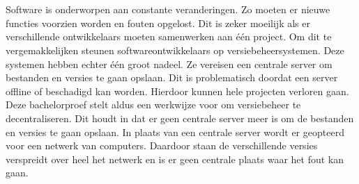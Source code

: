 


%



\chapter*{}
%
%
Software is onderworpen aan constante veranderingen. Zo moeten er nieuwe functies voorzien worden en fouten opgelost. Dit is zeker moeilijk als er verschillende ontwikkelaars moeten samenwerken aan één project. Om dit te vergemakkelijken steunen softwareontwikkelaars op versiebeheersystemen. Deze systemen hebben echter één groot nadeel. Ze vereisen een centrale server om bestanden en versies te gaan opslaan.  Dit is problematisch doordat een server offline of beschadigd kan worden. Hierdoor kunnen hele projecten verloren gaan. Deze bachelorproef stelt aldus een werkwijze voor om versiebeheer te decentraliseren. Dit houdt in dat er geen centrale server meer is om de bestanden en versies te gaan opslaan. In plaats van een centrale server wordt er geopteerd voor een netwerk van computers. Daardoor staan de verschillende versies verspreidt over heel het netwerk en is er geen centrale plaats waar het fout kan gaan.\\

